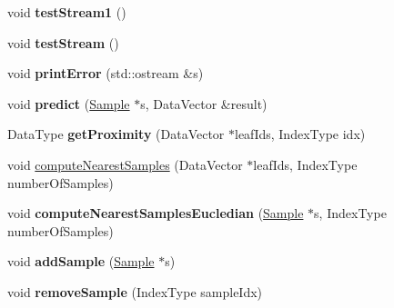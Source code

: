 \begin{DoxyCompactItemize}
\item 
\hypertarget{classffactory_1_1_stream_prox_cache_abe3c87e15fbdc1bf97f0cc7ffaf5d38e}{void {\bfseries test\-Stream1} ()}\label{classffactory_1_1_stream_prox_cache_abe3c87e15fbdc1bf97f0cc7ffaf5d38e}

\item 
\hypertarget{classffactory_1_1_stream_prox_cache_adf2e0db357a9731601f3571a265953e7}{void {\bfseries test\-Stream} ()}\label{classffactory_1_1_stream_prox_cache_adf2e0db357a9731601f3571a265953e7}

\item 
\hypertarget{classffactory_1_1_stream_prox_cache_a01ab2a54a7c59a7d0b432311e09d90fc}{void {\bfseries print\-Error} (std\-::ostream \&s)}\label{classffactory_1_1_stream_prox_cache_a01ab2a54a7c59a7d0b432311e09d90fc}

\item 
\hypertarget{classffactory_1_1_stream_prox_cache_a39382c67817cdedfd00190cc5388bebb}{void {\bfseries predict} (\hyperlink{classffactory_1_1_sample}{Sample} $\ast$s, Data\-Vector \&result)}\label{classffactory_1_1_stream_prox_cache_a39382c67817cdedfd00190cc5388bebb}

\item 
\hypertarget{classffactory_1_1_stream_prox_cache_acfc1bedf69eabe70fe64cc5048029e6b}{Data\-Type {\bfseries get\-Proximity} (Data\-Vector $\ast$leaf\-Ids, Index\-Type idx)}\label{classffactory_1_1_stream_prox_cache_acfc1bedf69eabe70fe64cc5048029e6b}

\item 
void \hyperlink{classffactory_1_1_stream_prox_cache_a39cf61205bb1c626c5b8fc0be3ec2c13}{compute\-Nearest\-Samples} (Data\-Vector $\ast$leaf\-Ids, Index\-Type number\-Of\-Samples)
\item 
\hypertarget{classffactory_1_1_stream_prox_cache_a8d01292ee250b227949f014527bf4c73}{void {\bfseries compute\-Nearest\-Samples\-Eucledian} (\hyperlink{classffactory_1_1_sample}{Sample} $\ast$s, Index\-Type number\-Of\-Samples)}\label{classffactory_1_1_stream_prox_cache_a8d01292ee250b227949f014527bf4c73}

\item 
\hypertarget{classffactory_1_1_stream_prox_cache_a73732b1c653fd8dea1c4741625b4676d}{void {\bfseries add\-Sample} (\hyperlink{classffactory_1_1_sample}{Sample} $\ast$s)}\label{classffactory_1_1_stream_prox_cache_a73732b1c653fd8dea1c4741625b4676d}

\item 
\hypertarget{classffactory_1_1_stream_prox_cache_a6eafd0806e0449b16f848b06a327e5b7}{void {\bfseries remove\-Sample} (Index\-Type sample\-Idx)}\label{classffactory_1_1_stream_prox_cache_a6eafd0806e0449b16f848b06a327e5b7}


\end{DoxyCompactItemize}
